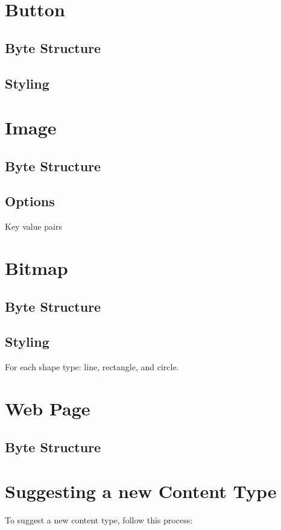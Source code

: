 \documentclass{report}
\begin{document}
\section{Button}
\subsection{Byte Structure}
\subsection{Styling}
\section{Image}
\subsection{Byte Structure}
\subsection{Options}
Key value pairs
\section{Bitmap}
\subsection{Byte Structure}
\subsection{Styling}
For each shape type: line, rectangle, and circle.
\section{Web Page}
\subsection{Byte Structure}
\section{Suggesting a new Content Type}
To suggest a new content type, follow this process:
\end{document}
